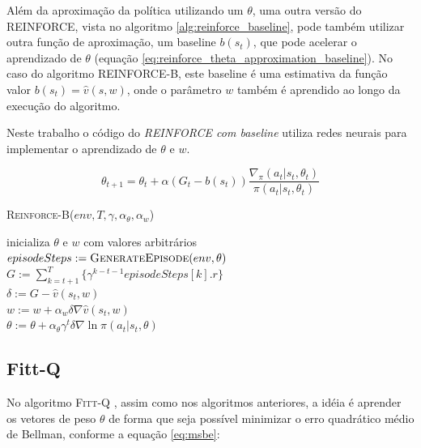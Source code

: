 \documentclass[letterpaper]{article}
\begin{document}
Além da aproximação da política utilizando um $\theta$, uma outra versão do \textsc{REINFORCE}, vista no algoritmo \ref{alg:reinforce_baseline}, pode também utilizar outra função de aproximação, um baseline $b(s_t)$, que pode acelerar o aprendizado de $\theta$ (equação \ref{eq:reinforce_theta_approximation_baseline}). No caso do algoritmo \textsc{REINFORCE-B}, este baseline é uma estimativa da função valor $b(s_t) = \hat{v}(s, w)$, onde o parâmetro $w$ também é aprendido ao longo da execução do algoritmo.

Neste trabalho o código do \textit{REINFORCE com baseline} utiliza redes neurais para implementar o aprendizado de $\theta$ e $w$.

\begin{equation}
  \label{eq:reinforce_theta_approximation_baseline}
  \theta_{t+1} = \theta_t + \alpha (G_t - b(s_t)) \frac{\nabla_{\pi}(a_t|s_t, \theta_t)}{\pi(a_t|s_t, \theta_t)} 
\end{equation}

\linesnumbered
\dontprintsemicolon
\begin{algorithm}[t!]
{
	\caption{\textsc{Reinforce-B}($ env, T, \gamma, \alpha_{\theta}, \alpha_{w} $)}
	\label{alg:reinforce_baseline}
    inicializa $ \theta $ e $ w $ com valores arbitrários \\

    {
      $episodeSteps := \textsc{GenerateEpisode}(env, \theta)$\\

      {
        $G := \sum_{k = t+1}^T \{ \gamma^{k-t-1} episodeSteps[k].r \}$\\
        $ \delta := G - \hat{v}(s_t, w) $\\
        $ w := w + \alpha_w \delta \nabla \hat{v}(s_t, w) $\\
        $ \theta := \theta + \alpha_{\theta} \gamma^t \delta \nabla \ln \pi(a_t|s_t, \theta) $
      }
    }
}
\end{algorithm}

\subsection{Fitt-Q}

No algoritmo \textsc{Fitt-Q} \cite{Riedmiller-2005}, assim como nos algoritmos anteriores, a idéia é aprender os vetores de peso $\theta$ de forma que seja possível minimizar o erro quadrático médio de Bellman, conforme a equação \ref{eq:msbe}:
\end{document}
